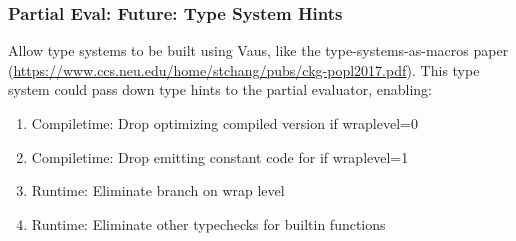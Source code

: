 \documentclass{beamer}
\begin{document}
\begin{frame}
\frametitle{Partial Eval: Future: Type System Hints}
Allow type systems to be built using Vaus, like the type-systems-as-macros paper (\url{https://www.ccs.neu.edu/home/stchang/pubs/ckg-popl2017.pdf}).
This type system could pass down type hints to the partial evaluator, enabling:
  \begin{enumerate}
    \item<2-> Compiletime: Drop optimizing compiled version if wraplevel=0
	\item<3-> Compiletime: Drop emitting constant code for if wraplevel=1
    \item<4-> Runtime: Eliminate branch on wrap level
    \item<5-> Runtime: Eliminate other typechecks for builtin functions
  \end{enumerate}
\end{frame}
\end{document}
